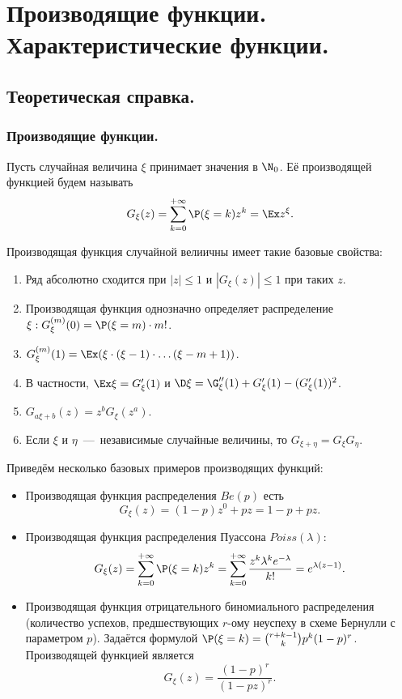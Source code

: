 \section{Производящие функции. Характеристические функции.}
\subsection{Теоретическая справка.}
\subsubsection{Производящие функции.}
\begin{definition}
    Пусть случайная величина $\xi$ принимает значения в $\N_0$.
    Её производящей функцией будем называть 
    \[
        G_{\xi}(z) = \sum\limits_{k = 0}^{+\infty} \P(\xi = k)z^k = \Ex z^\xi.
    \]
\end{definition}
\begin{proposition} Производящая функция случайной велиичны имеет такие базовые свойства:
    \begin{enumerate}
        \item Ряд абсолютно сходится при $|z| \leq 1$ и $|G_\xi(z)| \leq 1$ при таких $z$.
        \item Производящая функция однозначно определяет распределение $\xi: G^{(m)}_\xi (0) = \P(\xi = m)\cdot m!$.
        \item $G^{(m)}_\xi(1) = \Ex(\xi \cdot (\xi - 1) \cdot \ldots (\xi - m + 1))$.
        \item В частности, $\Ex \xi = G'_\xi(1)$ и $\D \xi = \G''_\xi(1) + G'_\xi(1) - (G'_\xi(1))^2$.
        \item $G_{a\xi + b}(z) = z^{b}G_\xi(z^a)$.
        \item Если $\xi$ и $\eta$~---~независимые случайные величины, то $G_{\xi + \eta} = G_{\xi}G_{\eta}$.
    \end{enumerate}
\end{proposition}
\begin{example}
    Приведём несколько базовых примеров производящих функций:
    \begin{itemize}
        \item Производящая функция распределения $Be(p)$ есть
         \[
             G_{\xi}(z) = (1 - p)z^0 + pz = 1 - p + pz.
         \]
        \item Производящая функция распределения Пуассона $Poiss(\lambda)$:
        \[
            G_{\xi}(z) = \sum\limits_{k = 0}^{+\infty}\P(\xi = k)z^k = \sum\limits_{k = 0}^{+\infty}\dfrac{z^k \lambda^k e^{-\lambda}}{k!} = e^{\lambda(z - 1)}.
        \]
        \item Производящая функция отрицательного биномиального распределения (количество успехов, предшествующих $r$-ому неуспеху в схеме Бернулли с параметром $p$).
        Задаётся формулой $\P(\xi = k) = \binom{r + k - 1}{k}p^k(1 - p)^r$.
        Производящей функцией является
        \[
            G_{\xi}(z) = \dfrac{(1 - p)^r}{(1 - pz)^r}.
        \]
    \end{itemize}
\end{example}
